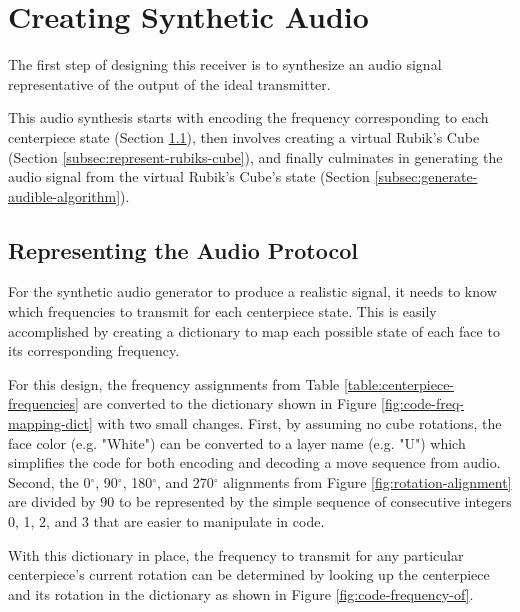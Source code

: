 \section{Creating Synthetic Audio}
\label{sec:synthetic-audio-generation}

The first step of designing this receiver is to synthesize an audio
signal representative of the output of the ideal transmitter.

This audio synthesis starts with encoding the frequency corresponding
to each centerpiece state (Section
\ref{subsec:represent-audio-protocol}), then involves creating a
virtual Rubik's Cube (Section \ref{subsec:represent-rubiks-cube}), and
finally culminates in generating the audio signal from the virtual
Rubik's Cube's state (Section \ref{subsec:generate-audible-algorithm}).

\newpage
\subsection{Representing the Audio Protocol}
\label{subsec:represent-audio-protocol}

For the synthetic audio generator to produce a realistic signal, it
needs to know which frequencies to transmit for each centerpiece state.
This is easily accomplished by creating a dictionary to map each
possible state of each face to its corresponding frequency.

For this design, the frequency assignments from Table
\ref{table:centerpiece-frequencies} are converted to the dictionary
shown in Figure \ref{fig:code-freq-mapping-dict} with two small
changes. First, by assuming no cube rotations, the face color (e.g.
"White") can be converted to a layer name (e.g. "U") which simplifies
the code for both encoding and decoding a move sequence from audio.
Second, the 0$^\circ$, 90$^\circ$, 180$^\circ$, and 270$^\circ$
alignments from Figure \ref{fig:rotation-alignment} are divided by 90
to be represented by the simple sequence of consecutive integers 0, 1,
2, and 3 that are easier to manipulate in code.

With this dictionary in place, the frequency to transmit for any
particular centerpiece's current rotation can be determined by looking
up the centerpiece and its rotation in the dictionary as shown in
Figure \ref{fig:code-frequency-of}.

